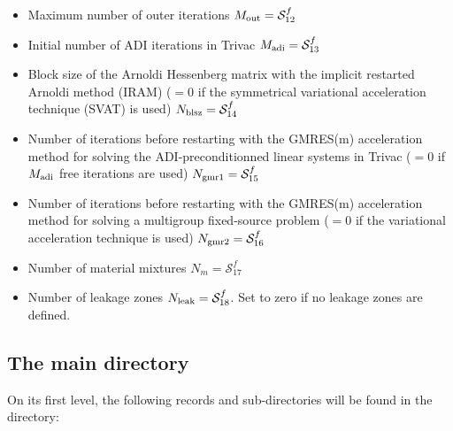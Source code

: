 \begin{itemize}
\item Maximum number of outer iterations $M_{\rm out}=\mathcal{S}^{f}_{12}$

\item Initial number of ADI iterations in Trivac $M_{\rm adi}=\mathcal{S}^{f}_{13}$

\item Block size of the Arnoldi Hessenberg matrix with the implicit restarted Arnoldi method (IRAM) ($=0$ if the symmetrical variational acceleration technique (SVAT) is used) $N_{\rm blsz}=\mathcal{S}^{f}_{14}$

\item Number of iterations before restarting with the GMRES(m) acceleration method for solving the ADI-preconditionned linear systems in Trivac ($=0$ if $M_{\rm adi}$ free iterations are used) $N_{\rm gmr1}=\mathcal{S}^{f}_{15}$

\item Number of iterations before restarting with the GMRES(m) acceleration method for solving a multigroup fixed-source problem ($=0$ if the variational acceleration technique is used) $N_{\rm gmr2}=\mathcal{S}^{f}_{16}$

\item Number of material mixtures $N_m=\mathcal{S}^{f}_{17}$

\item Number of leakage zones $N_{\rm leak}=\mathcal{S}^{f}_{18}$. Set to zero if no leakage zones are defined.

\end{itemize}

\subsection{The main  directory}\label{sect:fluxunkdirmain}

On its first level, the
following records and sub-directories will be found in the  directory:

